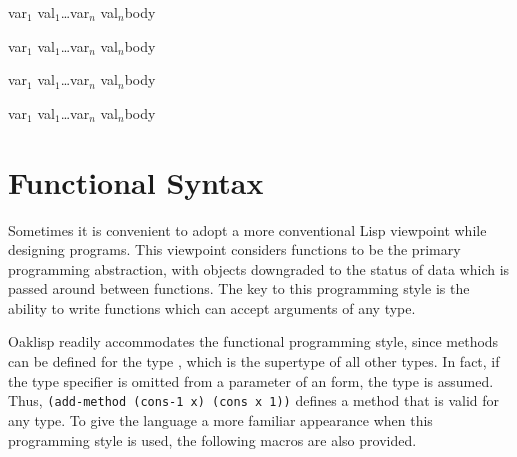 {\lpar\lpar var$_1$ val$_1$\rpar\ldots var$_n$ val$_n$\rpar \dt body}

{\lpar\lpar var$_1$ val$_1$\rpar\ldots var$_n$ val$_n$\rpar \dt body}

{\lpar\lpar var$_1$ val$_1$\rpar\ldots\lpar var$_n$ val$_n$\rpar\rpar \dt body}

{\lpar\lpar var$_1$ val$_1$\rpar\ldots\lpar var$_n$ val$_n$\rpar\rpar \dt body}


\section{Functional Syntax}

Sometimes it is convenient to adopt a more conventional Lisp
viewpoint while designing programs.  This viewpoint considers functions
to be the primary programming abstraction, with objects downgraded to
the status of data which is passed around between functions. The key
to this programming style is the ability to write functions which can accept
arguments of any type.

Oaklisp readily accommodates the functional programming style, since
methods can be defined for the type , which is the
supertype of all other types.  In fact, if the type specifier is
omitted from a parameter of an  form, the type
 is assumed.
Thus, \texttt{(add-method (\mbox{cons-1} x) (cons x 1))} defines a method that
is valid for any type.  To give the language a more familiar
appearance when this programming style is used, the following macros
are also provided.




